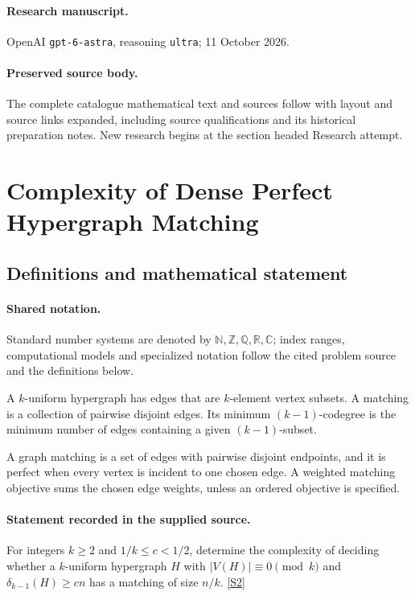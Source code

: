 \documentclass[11pt]{article}
\begin{document}
\paragraph{Research manuscript.} OpenAI \texttt{gpt-6-astra}, reasoning \texttt{ultra}; 11 October 2026.
\paragraph{Preserved source body.} The complete catalogue mathematical text and sources follow with layout and source links expanded, including source qualifications and its historical preparation notes. New research begins at the section headed Research attempt.

\section{Complexity of Dense Perfect Hypergraph Matching}\label{statement}

\subsection{Definitions and mathematical statement}

\paragraph{Shared notation.}Standard number systems are denoted by $\mathbb N,\mathbb Z,\mathbb Q,\mathbb R,\mathbb C$; index ranges, computational models and specialized notation follow the cited problem source and the definitions below.


A $k$-uniform hypergraph has edges that are $k$-element vertex subsets. A matching is a collection of pairwise disjoint edges. Its minimum $(k-1)$-codegree is the minimum number of edges containing a given $(k-1)$-subset.

A graph matching is a set of edges with pairwise disjoint endpoints, and it is perfect when every vertex is incident to one chosen edge. A weighted matching objective sums the chosen edge weights, unless an ordered objective is specified.
\paragraph{Statement recorded in the supplied source.}
For integers $k\geq2$ and $1/k\leq c<1/2$, determine the complexity of deciding whether a $k$-uniform hypergraph $H$ with $|V(H)|\equiv0\pmod k$ and $\delta_{k-1}(H)\geq cn$ has a matching of size $n/k$. \href{https://doi.org/10.4171/owr/2006/48}{[S2]}
\end{document}
